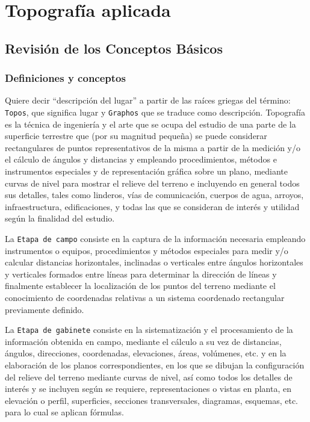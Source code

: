 \chapter{Topografía aplicada}

\section{Revisión de los Conceptos Básicos}

\subsection{Definiciones y conceptos}

\begin{definition}[Topografía]
    Quiere decir ``descripción del lugar'' a partir de las raíces griegas del término: \texttt{Topos}, que significa lugar y  \texttt{Graphos} que se traduce como descripción.
    Topografía es la técnica de ingeniería y el arte que se ocupa del estudio de una parte de la superficie terrestre que (por su magnitud pequeña) se puede considerar rectangulares de puntos representativos de la misma a partir de la medición y/o el cálculo de ángulos y distancias y empleando procedimientos, métodos e instrumentos especiales y de representación gráfica sobre un plano, mediante curvas de nivel para mostrar el relieve del terreno e incluyendo en general todos sus detalles, tales como linderos, vías de comunicación, cuerpos de agua, arroyos, infraestructura, edificaciones, y todas las que se consideran de interés y utilidad según la finalidad del estudio.
\end{definition}

La \texttt{Etapa de campo} consiste en la captura de la información necesaria empleando instrumentos
o equipos, procedimientos y métodos especiales para medir y/o calcular distancias horizontales, inclinadas o verticales entre ángulos horizontales y verticales formados entre líneas para determinar la dirección de líneas y finalmente establecer la localización de los puntos del terreno mediante el conocimiento de coordenadas relativas a un sistema coordenado rectangular previamente definido.

La \texttt{Etapa de gabinete} consiste en la sistematización y el procesamiento de la información obtenida en campo, mediante el cálculo a su vez de distancias, ángulos, direcciones, coordenadas, elevaciones, áreas, volúmenes, etc. y en la elaboración de los planos correspondientes, en los que se dibujan la configuración del relieve del terreno mediante curvas de nivel, así como todos los detalles de interés y se incluyen según se requiere, representaciones o vistas en planta, en elevación o perfil, superficies, secciones transversales, diagramas, esquemas, etc. para lo cual se aplican fórmulas.

